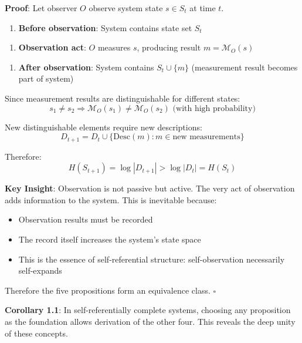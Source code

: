 \textbf{Proof}:
Let observer $O$ observe system state $s \in S_t$ at time $t$.

\begin{enumerate}
\item \textbf{Before observation}: System contains state set $S_t$
\end{enumerate}
\begin{enumerate}
\item \textbf{Observation act}: $O$ measures $s$, producing result $m = \mathcal{M}_O(s)$
\end{enumerate}
\begin{enumerate}
\item \textbf{After observation}: System contains $S_t \cup \{m\}$ (measurement result becomes part of system)
\end{enumerate}

Since measurement results are distinguishable for different states:
\begin{equation}
s_1 \neq s_2 \Rightarrow \mathcal{M}_O(s_1) \neq \mathcal{M}_O(s_2) \text{ (with high probability)}
\end{equation}

New distinguishable elements require new descriptions:
\begin{equation}
D_{t+1} = D_t \cup \{\text{Desc}(m): m \in \text{new measurements}\}
\end{equation}

Therefore:
\begin{equation}
H(S_{t+1}) = \log |D_{t+1}| > \log |D_t| = H(S_t)
\end{equation}

\textbf{Key Insight}: Observation is not passive but active. The very act of observation adds information to the system. This is inevitable because:
\begin{itemize}
\item Observation results must be recorded
\item The record itself increases the system's state space
\item This is the essence of self-referential structure: self-observation necessarily self-expands
\end{itemize}

Therefore the five propositions form an equivalence class. $\square$

\textbf{Corollary 1.1}:
\label{cor:1.1}
In self-referentially complete systems, choosing any proposition as the foundation allows derivation of the other four. This reveals the deep unity of these concepts.
